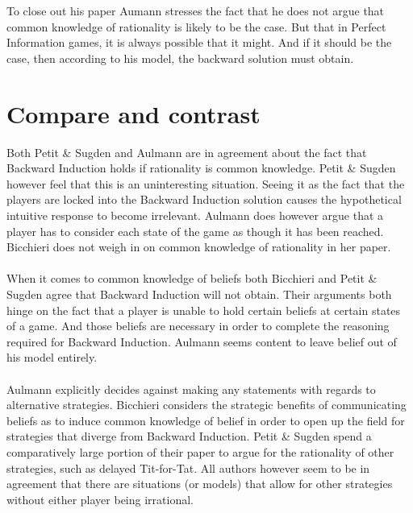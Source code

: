 \documentclass{article}
\begin{document}
\\
\\
To close out his paper Aumann stresses the fact that he does not argue that common knowledge of rationality is likely to be the case. But that in Perfect Information games, it is always possible that it might. And if it should be the case, then according to his model, the backward solution must obtain. 



















\section{Compare and contrast}

Both Petit \& Sugden and Aulmann are in agreement about the fact that Backward Induction holds if rationality is common knowledge. Petit \& Sugden however feel that this is an uninteresting situation. Seeing it as the fact that the players are locked into the Backward Induction solution causes the hypothetical intuitive response to become irrelevant. Aulmann does however argue that a player has to consider each state of the game as though it has been reached. Bicchieri does not weigh in on common knowledge of rationality in her paper.
\\
\\
When it comes to common knowledge of beliefs both Bicchieri and Petit \& Sugden agree that Backward Induction will not obtain. Their arguments both hinge on the fact that a player is unable to hold certain beliefs at certain states of a game. And those beliefs are necessary in order to complete the reasoning required for Backward Induction. Aulmann seems content to leave belief out of his model entirely.
\\
\\
Aulmann explicitly decides against making any statements with regards to alternative strategies. Bicchieri considers the strategic benefits of communicating beliefs as to induce common knowledge of belief in order to open up the field for strategies that diverge from Backward Induction. Petit \& Sugden spend a comparatively large portion of their paper to argue for the rationality of other strategies, such as delayed Tit-for-Tat. All authors however seem to be in agreement that there are situations (or models) that allow for other strategies without either player being irrational.
\end{document}
